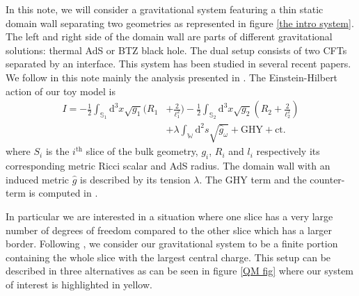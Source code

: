 In this note, we will consider a gravitational system featuring a thin static domain wall separating two geometries as represented in figure \ref{the intro system}. The left and right side of the domain wall are parts of different gravitational solutions: thermal AdS or BTZ black hole. The dual setup consists of two CFTs separated by an interface. This system has been studied in several recent papers\cite{Simidzija_2020, Bachas_2002, DeWolfe_2002}. We follow in this note mainly the analysis presented in \cite{Bachas_2021}. The Einstein-Hilbert action of our toy model is
\begin{equation}\label{action cft}
    \begin{split}
        I = -\frac{1}{2}\int_{\mathbb{S}_1}\text{d}^3x\sqrt{g_1}(R_1&+\frac{2}{\ell_1^2}) -\frac{1}{2}\int_{\mathbb{S}_2}\text{d}^3x\sqrt{g_2}(R_2+\frac{2}{\ell_2^2})\\
        & +\lambda  \int_{\mathbb{W}} \text{d}^2s\sqrt{\hat{g}_\omega} + \text{GHY} + \text{ct.}
    \end{split}
\end{equation}
where $S_i$ is the $i^\text{th}$ slice of the bulk geometry, $g_i$, $R_i$ and $l_i$ respectively its corresponding metric Ricci scalar and AdS radius. The domain wall with an induced metric $\hat{g}$ is described by its tension $\lambda$. The GHY term and the counter-term is computed in \cite{Bachas_2021}.

In particular we are interested in a situation where one slice has a very large number of degrees of freedom compared to the other slice which has a larger border. Following \cite{almheiri2019islands,Almheiri_2020}, we consider our gravitational system to be a finite portion containing the whole slice with the largest central charge. This setup can be described in three alternatives as can be seen in figure \ref{QM fig} where our system of interest is highlighted in yellow.

